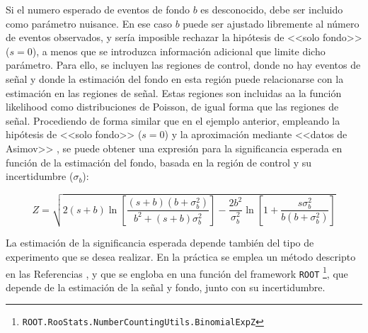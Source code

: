 Si el numero esperado de eventos de fondo $b$ es desconocido, debe ser incluido como parámetro nuisance. En ese caso $b$ puede ser ajustado libremente al número de eventos observados, y sería imposible rechazar la hipótesis de <<solo fondo>> ($s=0$), a menos que se introduzca información adicional que limite dicho parámetro. Para ello, se incluyen las regiones de control, donde no hay eventos de señal y donde la estimación del fondo en esta región puede relacionarse con la estimación en las regiones de señal. Estas regiones son incluidas aa la función likelihood como distribuciones de Poisson, de igual forma que las regiones de señal. Procediendo de forma similar que en el ejemplo anterior, empleando la hipótesis de <<solo fondo>> ($s=0$) y la aproximación mediante <<datos de Asimov>> \cite{Cowan:2010js}, se puede obtener una expresión para la significancia esperada en función de la estimación del fondo, basada en la región de control y su incertidumbre ($\sigma_b$):

\begin{equation}
	Z = \sqrt{ 2 (s+b) \ln{\left[ \frac{(s+b)(b+\sigma_b^2)}{b^2 + (s+b)\sigma_b^2} \right]} - \frac{2 b^2}{\sigma_b^2} \ln{ \left[ 1 + \frac{s \sigma_b^2}{b(b+\sigma_b^2)} \right] } }
\end{equation}

La estimación de la significancia esperada depende también del tipo de experimento que se desea realizar. En la práctica se emplea un método descripto en las Referencias \cite{Linnemann:2003vw, stat_1, ATL-PHYS-PUB-2020-025}, y que se engloba en una función del framework \texttt{ROOT} \footnote{\texttt{ROOT.RooStats.NumberCountingUtils.BinomialExpZ}}, que depende de la estimación de la señal y fondo, junto con su incertidumbre. 

